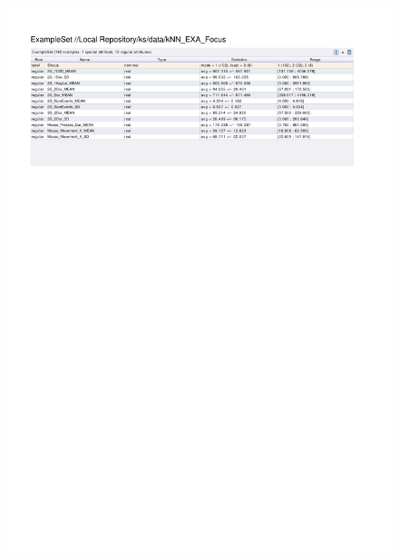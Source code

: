 \begin{figure}[htp]
  \centerline{\includegraphics[trim=0 620 0 60,clip,width=16.09cm]{results/kNN_EXA_Focus.pdf}} \caption{
} \label{kNN_K_Focus}
\end{figure}

